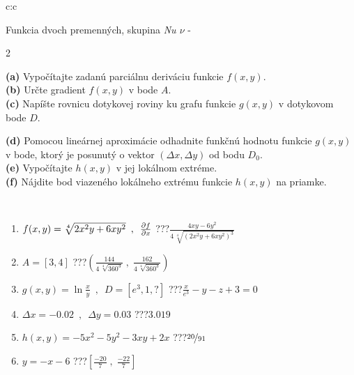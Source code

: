 \documentclass[10pt]{report}
\begin{document}
\begin{tabular}{c:c}
\begin{minipage}[c][104.5mm][t]{0.5\linewidth}
\begin{center}
\vspace{7mm}
{\huge \LARGE Funkcia dvoch premenných, skupina \textit{Nu $\nu$} -}\\[5mm]
\begin{minipage}{0.95\linewidth}
\begin{center}
{\small \begin{multicols}{2} \raggedright
\textbf{(a)} Vypočítajte zadanú parciálnu deriváciu funkcie \(f(x,y)\). \\[1mm]
\textbf{(b)} Určte gradient \(f(x,y)\) v bode \(A\). \\[1mm]
\textbf{(c)} Napíšte rovnicu dotykovej roviny ku grafu funkcie \(g(x,y)\) v dotykovom bode \(D\). \par \columnbreak
\textbf{(d)} Pomocou lineárnej aproximácie odhadnite funkčnú hodnotu funkcie \(g(x,y)\) v bode, ktorý je posunutý o vektor \((\Delta x, \Delta y)\) od bodu \(D_0\). \\[1mm]
\textbf{(e)} Vypočítajte \(h(x,y)\) v jej lokálnom extréme. \\[1mm]
\textbf{(f)} Nájdite bod viazeného lokálneho extrému funkcie \(h(x,y)\) na priamke. \\[1mm]
\end{multicols}
}
\end{center}
\end{minipage}
\\[4mm]
\begin{minipage}{0.79\linewidth}
\begin{center}
\begin{varwidth}{\linewidth}
\begin{enumerate}
\normalsizerr
\item $f(x,y) = \sqrt[4]{2x^2y + 6xy^2}\enspace , \enspace \pdv{f}{x}$\quad \dotfill\; ???\;\dotfill \quad $\frac{4xy-6y^2}{4\,\sqrt[4]{(2x^2y+6xy^2)^{3}}}$
\item $A = [3, 4]$\quad \dotfill\; ???\;\dotfill \quad $\left( \frac{144}{4\,\sqrt[4]{360^3}} \;,\; \frac{162}{4\,\sqrt[4]{360^3}} \right)$
\item $g(x,y) = \ln\frac{x}{y} \enspace , \enspace D=[e^{3},1,?]$\quad \dotfill\; ???\;\dotfill \quad $\frac{x}{e^3} - y - z + 3 = 0$
\item $\Delta x = {-0.02} \enspace,\enspace \Delta y = {0.03}$\quad \dotfill\; ???\;\dotfill \quad $3.019$
\item $h(x,y) = -5x^2-5y^2-3xy+2x$\quad \dotfill\; ???\;\dotfill \quad $\nicefrac{20}{91}$
\item $y = -x-6$\quad \dotfill\; ???\;\dotfill \quad $\left[\frac{-20}{7}\;,\;\frac{-22}{7}\right]$

\end{enumerate}
\end{varwidth}
\end{center}
\end{minipage}
\end{center}
\end{minipage}
\end{tabular}
\end{document}
